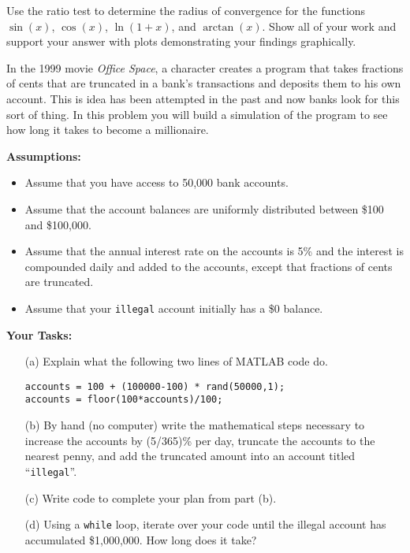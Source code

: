 \begin{problem}
    Use the ratio test to determine the radius of convergence for the functions $\sin(x)$, $\cos(x)$,
    $\ln(1+x)$, and $\arctan(x)$.  Show all of your work and support your answer with
    plots demonstrating your findings graphically.
\end{problem}

\begin{problem}
    In the 1999 movie {\it Office Space}, a character creates a program that takes
    fractions of cents that are truncated in a bank's transactions and deposits them to
    his own account.  This is idea has been attempted in the past and now banks
    look for this sort of thing.  In this problem you will build a simulation of the
    program to see how long it takes to become a millionaire.  

    {\bf Assumptions:}
    \begin{itemize}
        \item Assume that you have access to 50,000 bank accounts.
        \item Assume that the account balances are uniformly distributed between
            \$100 and \$100,000.
        \item Assume that the annual interest rate on the accounts is 5\% and the interest
            is compounded daily and added to the accounts, except that fractions of cents
            are truncated.
        \item Assume that your \texttt{illegal} account initially has a \$0 balance.
    \end{itemize}

    {\bf Your Tasks:}
    \begin{enumerate}
        \item[(a)] Explain what the following two lines of MATLAB code do.
\begin{lstlisting}
accounts = 100 + (100000-100) * rand(50000,1);
accounts = floor(100*accounts)/100;
\end{lstlisting}
        \item[(b)] By hand (no computer) write the mathematical steps necessary to
            increase the accounts by (5/365)\% per day, truncate the accounts to the
            nearest penny, and add the truncated amount into an account titled
            ``\texttt{illegal}''.
        \item[(c)] Write code to complete your plan from part (b).
        \item[(d)] Using a \texttt{while} loop, iterate over your code until the illegal
            account has accumulated \$1,000,000.  How long does it take?
    \end{enumerate}
\end{problem}



